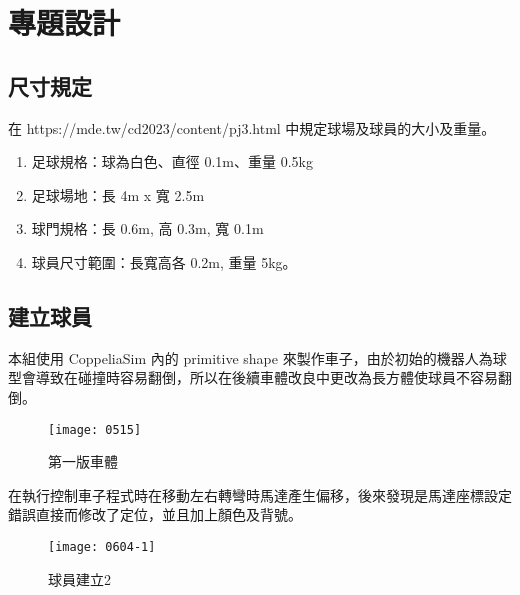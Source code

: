 \chapter{專題設計}
\renewcommand{\baselinestretch}{10.0} %
\setcounter{page}{1}  %
\fontsize{14pt}{2.5pt}\sectionef

\section{尺寸規定}
在 https://mde.tw/cd2023/content/pj3.html 中規定球場及球員的大小及重量。\\
\begin{enumerate}
\item 足球規格：球為白色、直徑 0.1m、重量 0.5kg\\
\item 足球場地：長 4m x 寬 2.5m\\
\item 球門規格：長 0.6m, 高 0.3m, 寬 0.1m\\
\item 球員尺寸範圍：長寬高各 0.2m, 重量 5kg。\\
\end{enumerate}

\section{建立球員}
本組使用 CoppeliaSim 內的 primitive shape 來製作車子，由於初始的機器人為球型會導致在碰撞時容易翻倒，所以在後續車體改良中更改為長方體使球員不容易翻倒。\\
\begin{figure}[hbt!]
\begin{center}
\texttt{[image: 0515]}
\caption{\Large 第一版車體}\label{車體}
\end{center}
\end{figure}
在執行控制車子程式時在移動左右轉彎時馬達產生偏移，後來發現是馬達座標設定錯誤直接而修改了定位，並且加上顏色及背號。
\begin{figure}[hbt!]
\begin{center}
\texttt{[image: 0604-1]}
\caption{\Large 球員建立2}\label{球員建立2}
\end{center}
\end{figure}\

